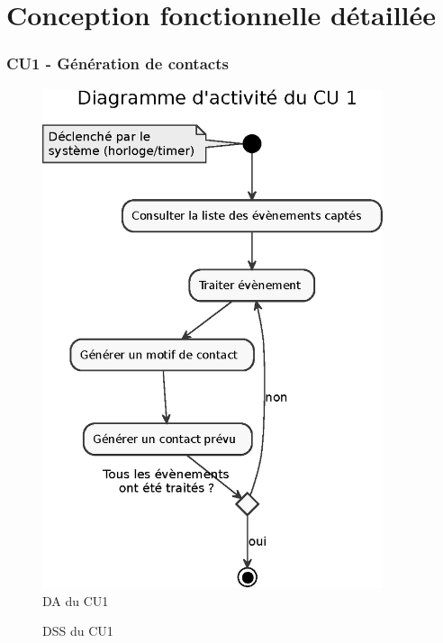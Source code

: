\part{Conception fonctionnelle détaillée}
\setcounter{section}{0}

\section{CU1 - Génération de contacts}

\begin{figure}[H]
\centering
\includegraphics[width=10cm]{figures/eps/DA_CU1.eps}
\caption{DA du CU1}
\end{figure}

\begin{figure}[H]
\noindent{}
\caption{DSS du CU1}
\end{figure}

